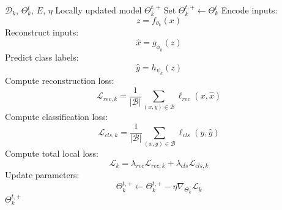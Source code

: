 \documentclass[conference]{IEEEtran}
\begin{document}
\begin{algorithm}[t]
\caption{Local Representation Learner Update at Client $k$}
\label{alg:local_update}
\footnotesize
\begin{algorithmic}[1]
\REQUIRE $\mathcal{D}_k$, $\Theta_k^t$, $E$, $\eta$
\ENSURE Locally updated model $\Theta_k^{t,+}$
\STATE Set $\Theta_k^{t,+}\leftarrow \Theta_k^t$
        \STATE Encode inputs:
        \begin{equation}
z=f_{\theta_k}(x)
\end{equation}
        \STATE Reconstruct inputs:
        \begin{equation}
\hat{x}=g_{\phi_k}(z)
\end{equation}
        \STATE Predict class labels:
        \begin{equation}
\hat{y}=h_{\psi_k}(z)
\end{equation}
        \STATE Compute reconstruction loss:
        \begin{equation}
\mathcal{L}_{rec,k}
        =
        \frac{1}{|\mathcal{B}|}
        \sum_{(x,y)\in\mathcal{B}}
        \ell_{rec}(x,\hat{x})
\end{equation}
        \STATE Compute classification loss:
        \begin{equation}
\mathcal{L}_{cls,k}
        =
        \frac{1}{|\mathcal{B}|}
        \sum_{(x,y)\in\mathcal{B}}
        \ell_{cls}(y,\hat{y})
\end{equation}
        \STATE Compute total local loss:
        \begin{equation}
\mathcal{L}_{k}
        =
        \lambda_{rec}\mathcal{L}_{rec,k}
        +
        \lambda_{cls}\mathcal{L}_{cls,k}
\end{equation}
        \STATE Update parameters:
        \begin{equation}
\Theta_k^{t,+}
        \leftarrow
        \Theta_k^{t,+}
        -
        \eta\nabla_{\Theta_k}\mathcal{L}_{k}
\end{equation}
    \ENDFOR
\ENDFOR
\RETURN $\Theta_k^{t,+}$
\end{algorithmic}
\end{algorithm}
\end{document}
